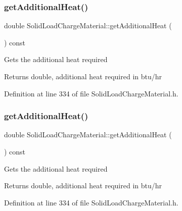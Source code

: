 \subsubsection{\texorpdfstring{get\+Additional\+Heat()}{getAdditionalHeat()}\hspace{0.1cm}{\footnotesize\ttfamily [1/3]}}
{\footnotesize\ttfamily double Solid\+Load\+Charge\+Material\+::get\+Additional\+Heat (\begin{DoxyParamCaption}{ }\end{DoxyParamCaption}) const\hspace{0.3cm}{\ttfamily [inline]}}

Gets the additional heat required \begin{DoxyReturn}{Returns}
double, additional heat required in btu/hr 
\end{DoxyReturn}


Definition at line 334 of file Solid\+Load\+Charge\+Material.\+h.

\mbox{\label{class_solid_load_charge_material_a0fde17a84b10bb75bf78227548fbf26c}} 
\subsubsection{\texorpdfstring{get\+Additional\+Heat()}{getAdditionalHeat()}\hspace{0.1cm}{\footnotesize\ttfamily [2/3]}}
{\footnotesize\ttfamily double Solid\+Load\+Charge\+Material\+::get\+Additional\+Heat (\begin{DoxyParamCaption}{ }\end{DoxyParamCaption}) const\hspace{0.3cm}{\ttfamily [inline]}}

Gets the additional heat required \begin{DoxyReturn}{Returns}
double, additional heat required in btu/hr 
\end{DoxyReturn}


Definition at line 334 of file Solid\+Load\+Charge\+Material.\+h.

\mbox{\label{class_solid_load_charge_material_a0fde17a84b10bb75bf78227548fbf26c}} 
